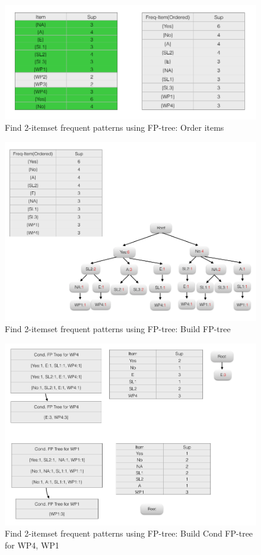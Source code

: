 \documentclass[paper=a4, fontsize=11pt]{scrartcl} %
\numberwithin{equation}{section} %
\numberwithin{figure}{section} %
\numberwithin{table}{section} %
\begin{document}
\begin{figure}[h]
    \centering
    \includegraphics[scale=0.5]{image3.png}
    \caption{Find 2-itemset frequent patterns using FP-tree: Order items}
\end{figure}
\begin{figure}[h]
    \centering
    \includegraphics[scale=0.5]{image4.png}
    \caption{Find 2-itemset frequent patterns using FP-tree: Build FP-tree}
\end{figure}
\begin{figure}[h]
    \centering
    \includegraphics[scale=0.5]{image5.png}
    \caption{Find 2-itemset frequent patterns using FP-tree: Build Cond FP-tree for WP4, WP1}
\end{figure}
\end{document}
